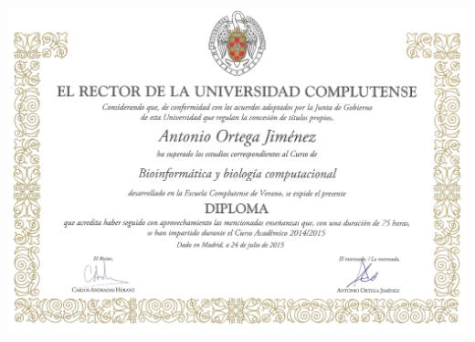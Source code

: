\documentclass[letterpaper]{article}
\begin{document}
\thispagestyle{empty}

\hypertarget{complu}{}
\begin{landscape}
\centering
\includegraphics[scale=0.2]{./bioinformatica2.jpg}
\end{landscape}
\restoregeometry
\clearpage



\hypertarget{exp-en}{}

\clearpage


\hypertarget{cae}{}

\clearpage



\end{document}
